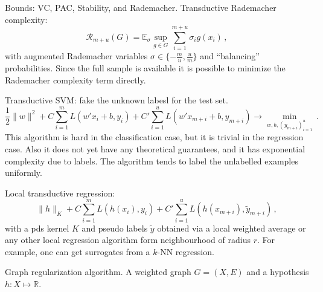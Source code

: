 \documentclass[a4paper]{article}
\newcommand{\Real}{\mathbb{R}}
\newcommand{\ex}{\mathbb{E}}
\begin{document}
Bounds: VC, PAC, Stability, and Rademacher. Transductive Rademacher complexity:
\[\mathcal{R}_{m+u}(G) = \ex_\sigma \sup_{g\in G} \sum_{i=1}^{m+u} \sigma_i g(x_i) \,, \]
with augmented Rademacher variables $\sigma \in \{-\frac{m}{u}, \frac{u}{m}\}$ and
``balancing'' probabilities.
Since the full sample is available it is possible to minimize the Rademacher complexity
term directly.


Transductive SVM: fake the unknown labesl for the test set.
\[ \frac{1}{2} \|w\|^2
    + C\sum_{i=1}^m L(w'x_i + b, y_i)
    + C'\sum_{i=1}^u L(w'x_{m+i} + b, y_{m+i})
    \to \min_{w, b,(y_{m+i})_{i=1}^u }
    \,.\]
This algorithm is hard in the classification case, but it is trivial in the regression
case. Also it does not yet have any theoretical guarantees, and it has exponential
complexity due to labels. The algorithm tends to label the unlabelled examples uniformly.

Local transductive regression:
\[ \|h\|_K + C \sum_{i=1}^m L(h(x_i), y_i)
     + C' \sum_{i=1}^u L(h(x_{m+i}), \tilde{y}_{m+i})
     \,, \]
with a pds kernel $K$ and pseudo labels $\tilde{y}$ obtained via a local weighted
average or any other local regression algorithm form neighbourhood of radius $r$.
For example, one can get surrogates from a $k$-NN regression.

Graph regularization algorithm. A weighted graph $G=(X, E)$ and a hypothesis $h:X\mapsto \Real$.




\end{document}
